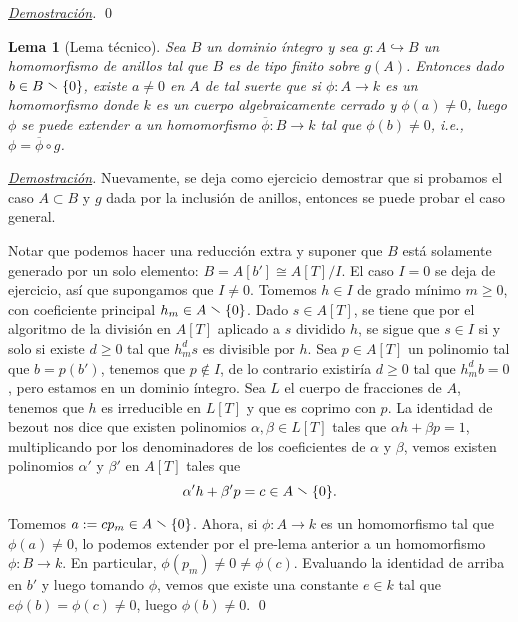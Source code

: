 \documentclass[12pt]{article}
\theoremstyle{customTheorem}
\newtheorem{lemma}[theorem]{Lema}
\theoremstyle{customDefinition}
\renewenvironment{proof}[1][Demostración]{\noindent \textit{\underline{#1}.\hspace{2mm}}}{\hfill\qed}
\renewcommand{\setminus}{\mathrel{\stackon[0.5pt]{}{$\smallsetminus$}}}
\renewcommand{\bar}[1]{\overline{#1}}
\begin{document}
\begin{proof}
\end{proof}

\begin{lemma}[Lema técnico]\label{Lema tecnico}
    Sea $B$ un dominio íntegro y sea $g : A \hookrightarrow B$ un homomorfismo de anillos tal que $B$ es de tipo finito sobre $g(A)$. Entonces dado $b \in B \setminus \{0\}$, existe $a \neq 0$ en $A$ de tal suerte que si $\phi : A \to k$ es un homomorfismo donde $k$ es un cuerpo algebraicamente cerrado y $\phi (a) \neq 0$, luego $\phi$ se puede extender a un homomorfismo $\bar \phi : B \to k$ tal que $\phi (b) \neq 0$, i.e., $\phi = \bar \phi \circ g$.
\end{lemma}
\begin{proof}
    Nuevamente, se deja como ejercicio demostrar que si probamos el caso $A \subset B$ y $g$ dada por la inclusión de anillos, entonces se puede probar el caso general.

    Notar que podemos hacer una reducción extra y suponer que $B$ está solamente generado por un solo elemento: $B = A[b'] \cong A[T] / I$. El caso $I = 0$ se deja de ejercicio, así que supongamos que $I \neq 0$. Tomemos $h \in I$ de grado mínimo $m \geq 0$, con coeficiente principal $h_m \in A \setminus \{0\}$. Dado $s \in A[T]$, se tiene que por el algoritmo de la división en $A[T]$ aplicado a $s$ dividido $h$, se sigue que $s \in I$ si y solo si existe $d \geq 0$ tal que $h_m^d s$ es divisible por $h$. Sea $p \in A[T]$ un polinomio tal que $b = p(b')$, tenemos que $p \not \in I$, de lo contrario existiría $d \geq 0$ tal que $h_m^d b = 0$, pero estamos en un dominio íntegro. Sea $L$ el cuerpo de fracciones de $A$, tenemos que $h$ es irreducible en $L[T]$ y que es coprimo con $p$. La identidad de bezout nos dice que existen polinomios $\alpha, \beta \in L[T]$ tales que $\alpha h + \beta p = 1$,
    multiplicando por los denominadores de los coeficientes de $\alpha$ y $\beta$, vemos existen polinomios $\alpha '$ y $\beta '$ en $A[T]$ tales que
    \[
    \alpha ' h + \beta ' p = c \in A \setminus \{0\}.
    \]

    Tomemos $a := c p_m \in A \setminus \{0\}$. Ahora, si $\phi : A \to k$ es un homomorfismo tal que $\phi (a) \neq 0$, lo podemos extender por el pre-lema anterior a un homomorfismo $\phi : B \to k$. En particular, $\phi (p_m) \neq 0 \neq \phi (c)$. Evaluando la identidad de arriba en $b'$ y luego tomando $\phi$, vemos que existe una constante $e \in k$ tal que $e \phi (b) = \phi (c) \neq 0$, luego $\phi (b) \neq 0$.
\end{proof}
\end{document}
